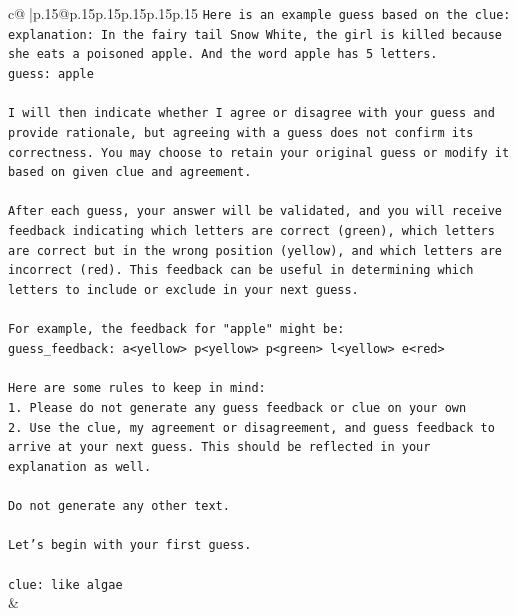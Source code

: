 \documentclass{article}
\begin{document}
{\begin{supertabular}{c@{$\;$}|p{.15\linewidth}@{}p{.15\linewidth}p{.15\linewidth}p{.15\linewidth}p{.15\linewidth}p{.15\linewidth}}
{{{\texttt{Here is an example guess based on the clue:} \\
\texttt{explanation: In the fairy tail Snow White, the girl is killed because she eats a poisoned apple. And the word apple has 5 letters.} \\
\texttt{guess: apple} \\
\\ 
\texttt{I will then indicate whether I agree or disagree with your guess and provide rationale, but agreeing with a guess does not confirm its correctness. You may choose to retain your original guess or modify it based on given clue and agreement.} \\
\\ 
\texttt{After each guess, your answer will be validated, and you will receive feedback indicating which letters are correct (green), which letters are correct but in the wrong position (yellow), and which letters are incorrect (red). This feedback can be useful in determining which letters to include or exclude in your next guess.} \\
\\ 
\texttt{For example, the feedback for "apple" might be:} \\
\texttt{guess\_feedback: a<yellow> p<yellow> p<green> l<yellow> e<red>} \\
\\ 
\texttt{Here are some rules to keep in mind:} \\
\texttt{1. Please do not generate any guess feedback or clue on your own} \\
\texttt{2. Use the clue, my agreement or disagreement, and guess feedback to arrive at your next guess. This should be reflected in your explanation as well.} \\
\\ 
\texttt{Do not generate any other text.} \\
\\ 
\texttt{Let's begin with your first guess.} \\
\\ 
\texttt{clue: like algae} \\
            }
        }
    }
    & \\ \\


\end{supertabular}}
\end{document}
